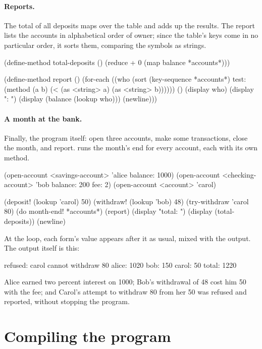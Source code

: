 \paragraph{Reports.} The total of all deposits maps  over
the table and adds up the results. The report lists the accounts in
alphabetical order of owner; since the table's keys come in no particular
order, it sorts them, comparing the symbols as strings.

\begin{dylan}
(define-method total-deposits ()
  (reduce + 0 (map balance *accounts*)))

(define-method report ()
  (for-each ((who (sort (key-sequence *accounts*)
                        test: (method (a b)
                                (< (as <string> a) (as <string> b))))))
            ()
    (display who)
    (display ": ")
    (display (balance (lookup who)))
    (newline)))
\end{dylan}

\paragraph{A month at the bank.} Finally, the program itself: open three
accounts, make some transactions, close the month, and report.
 runs the month's end for every account,
each with its own method.

\begin{dylan}
(open-account <savings-account> 'alice balance: 1000)
(open-account <checking-account> 'bob balance: 200 fee: 2)
(open-account <account> 'carol)

(deposit! (lookup 'carol) 50)
(withdraw! (lookup 'bob) 48)
(try-withdraw 'carol 80)
(do month-end! *accounts*)
(report)
(display "total: ")
(display (total-deposits))
(newline)
\end{dylan}

At the loop, each form's value appears after it as usual, mixed with the
output. The output itself is this:

\begin{shell}
refused: carol cannot withdraw 80
alice: 1020
bob: 150
carol: 50
total: 1220
\end{shell}

Alice earned two percent interest on 1000; Bob's withdrawal of 48 cost
him 50 with the fee; and Carol's attempt to withdraw 80 from her 50 was
refused and reported, without stopping the program.

\section{Compiling the program}\label{sec:tut-compile}

